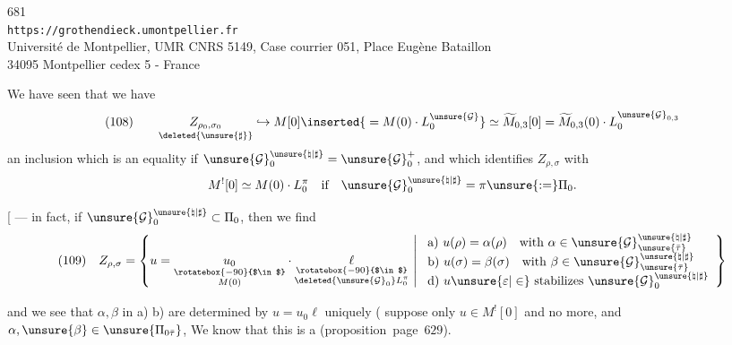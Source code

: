 
\begin{center}
681\\
\texttt{https://grothendieck.umontpellier.fr}\\
Université de Montpellier, UMR CNRS 5149, Case courrier 051, Place Eugène Bataillon\\
34095 Montpellier cedex 5 - France
\end{center}



We have seen that we have
\[
(108)\qquad
\underset{\deleted{\unsure{\sharp}}}{Z_{\rho_0,\sigma_0}}
\hookrightarrow M[0]\inserted{{}=M(0)\cdot L_0^{\unsure{\mathcal G}}}
\simeq \widetilde M_{0,3}[0]
=\widetilde M_{0,3}(0)\cdot L_0^{\unsure{\mathcal G}_{0,3}}
\]
an inclusion which is an equality if
$\unsure{\mathcal G}_0^{\unsure{\natural|\sharp}}=\unsure{\mathcal G}_0^+$,
and which identifies $Z_{\rho,\sigma}$ with
\[
M^{!}[0]\simeq M(0)\cdot L_0^\pi
\quad\text{if}\quad
\unsure{\mathcal G}_0^{\unsure{\natural|\sharp}}=\pi\unsure{:=}\Pi_0.
\]

[ --- in fact, if
$\unsure{\mathcal G}_0^{\unsure{\natural|\sharp}}\subset\Pi_0$,
then we find
\[
\begin{split}
(109)\quad Z_{\rho,\sigma}=\left\{
u=\underset{\substack{\rotatebox{-90}{$\in$}\\M(0)}}{u_0}\cdot
\underset{\substack{\rotatebox{-90}{$\in$}\\\deleted{\unsure{\mathcal G}_0}L_0^\pi}}{\ell}
\ \middle|\
\begin{array}{l}
\text{a) }u(\rho)=\alpha(\rho)\quad\text{with }\alpha\in
\unsure{\mathcal G}_{\unsure{\bar\tau}}^{\unsure{\natural|\sharp}}\\
\text{b) }u(\sigma)=\beta(\sigma)\quad\text{with }\beta\in
\unsure{\mathcal G}_{\unsure{\bar\tau}}^{\unsure{\natural|\sharp}}\\
\text{d) }u\unsure{\varepsilon|\in}\text{ stabilizes }
\unsure{\mathcal G}_0^{\unsure{\natural|\sharp}}
\end{array}\right\}
\end{split}
\]

and we see that $\alpha,\beta$ in a) b) are determined by
$u=u_0\ell$ uniquely
( 
 suppose only $u\in M^{!}[0]$ and no more,
and 
$\alpha,\unsure{\beta}\in\unsure{\Pi_{0\bar\tau}}$,
We know that this is a 
(proposition\ page\ $629$).

